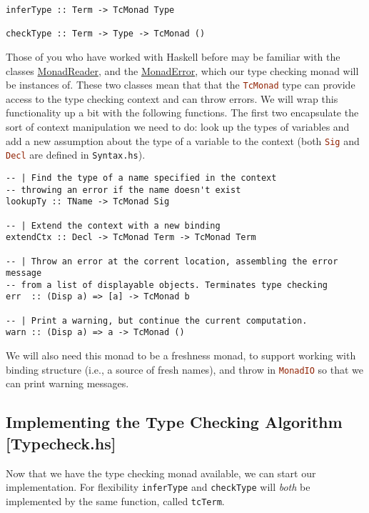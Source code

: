 \documentclass{article}
\newcommand\cd[1]{\lstinline[language=Haskell]{#1}}
\theoremstyle{definition}
\begin{document}
\begin{verbatim}
inferType :: Term -> TcMonad Type

checkType :: Term -> Type -> TcMonad ()
\end{verbatim}

Those of you who have worked with Haskell before may be familiar with the
classes
\href{https://hackage.haskell.org/package/mtl-2.1.2/docs/Control-Monad-Reader.html}{MonadReader},
and the
\href{https://hackage.haskell.org/package/mtl-2.1.2/docs/Control-Monad-Error.html}{MonadError},
which our type checking monad will be instances of. These two classes mean
that that the \cd{TcMonad} type can provide access to the type checking
context and can throw errors. We will wrap this functionality up a bit with the
following functions. The first two encapsulate the sort of context
manipulation we need to do: look up the types of variables and add a new
assumption about the type of a variable to the context (both \cd{Sig} and
\cd{Decl} are defined in \cd{Syntax.hs}).

\begin{verbatim}
-- | Find the type of a name specified in the context
-- throwing an error if the name doesn't exist
lookupTy :: TName -> TcMonad Sig

-- | Extend the context with a new binding
extendCtx :: Decl -> TcMonad Term -> TcMonad Term

-- | Throw an error at the corrent location, assembling the error message
-- from a list of displayable objects. Terminates type checking
err  :: (Disp a) => [a] -> TcMonad b

-- | Print a warning, but continue the current computation.
warn :: (Disp a) => a -> TcMonad ()
\end{verbatim}

We will also need this monad to be a freshness monad, to support working with
binding structure (i.e., a source of fresh names), and throw in \cd{MonadIO} so
that we can print warning messages.

\subsection{Implementing the Type Checking Algorithm
{[}Typecheck.hs{]}}

Now that we have the type checking monad available, we can start our
implementation. For flexibility \texttt{inferType} and \texttt{checkType} will
\emph{both} be implemented by the same function, called \cd{tcTerm}.
\end{document}
